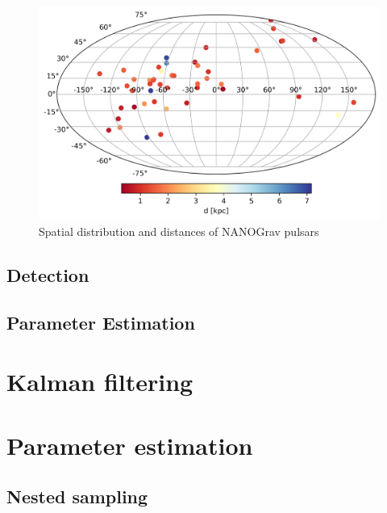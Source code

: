 \documentclass[fleqn,usenatbib,useAMS]{mnras}
\begin{document}
\begin{figure}
	\includegraphics[width=0.8\columnwidth]{images/pulsars}
	\caption{Spatial distribution and distances of NANOGrav pulsars}
	\label{fig:pulsar_distrib}
\end{figure}


\subsection{Detection}



\subsection{Parameter Estimation}











\section{Kalman filtering}



\section{Parameter estimation}












\subsection{Nested sampling}
\end{document}
